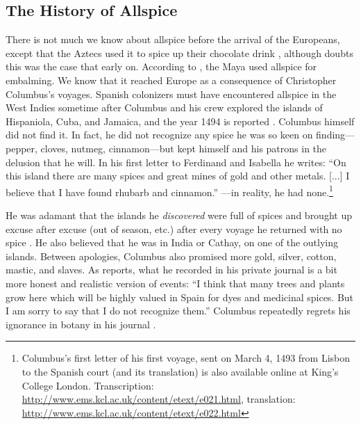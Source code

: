 

\subsection{The History of Allspice}


There is not much we know about allspice before the arrival of the Europeans, except that the Aztecs used it to spice up their chocolate drink \autocites[27]{farrell_spices_1985}, although \textcite[145, 177]{dalby_dangerous_2000} doubts this was the case that early on. According to \textcite[21]{duke_crc_2002}, the Maya used allspice for embalming. We know that it reached Europe as a consequence of Christopher Columbus's voyages. Spanish colonizers must have encountered allspice in the West Indies sometime after Columbus and his crew explored the islands of Hispaniola, Cuba, and Jamaica, and the year 1494 is reported \autocite[12]{opara_culinary_2021}. Columbus himself did not find it. In fact, he did not recognize any spice he was so keen on finding---pepper, cloves, nutmeg, cinnamon---but kept himself and his patrons in the delusion that he will. In his first letter to Ferdinand and Isabella he writes: ``On this island there are many spices and great mines of gold and other metals. [...] I believe that I have found rhubarb and cinnamon.'' \autocite[10-18]{columbus_spanish_1893} ---in reality, he had none.\footnote{Columbus's first letter of his first voyage, sent on March 4, 1493 from Lisbon to the Spanish court (and its translation) is also available online at King's College London. Transcription: \url{http://www.ems.kcl.ac.uk/content/etext/e021.html}, translation: \url{http://www.ems.kcl.ac.uk/content/etext/e022.html}}

He was adamant that the islands he \textit{discovered} were full of spices and brought up excuse after excuse (out of season, etc.) after every voyage he returned with no spice \autocite[149]{dalby_dangerous_2000}. He also believed that he was in India or Cathay, on one of the outlying islands. Between apologies, Columbus also promised more gold, silver, cotton, mastic, and slaves. As \textcite[150]{dalby_dangerous_2000} reports, what he recorded in his private journal is a bit more honest and realistic version of events: ``I think that many trees and plants grow here which will be highly valued in Spain for dyes and medicinal spices. But I am sorry to say that I do not recognize them.'' Columbus repeatedly regrets his ignorance in botany in his journal \autocite[see also][57]{columbus_journal_2010}.

